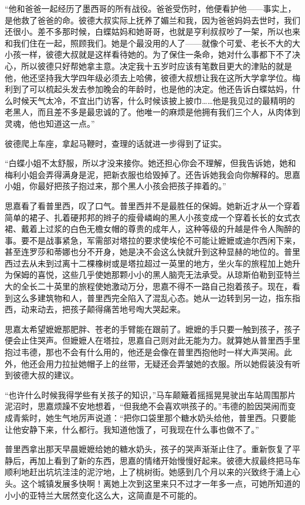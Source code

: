 \par “他和爸爸一起经历了墨西哥的所有战役。爸爸受伤时，他便看护他——事实上，是他救了爸爸的命。彼德大叔实际上抚养了媚兰和我，因为爸爸妈妈去世时，我们还很小。差不多那时候，白蝶姑妈和她哥哥，也就是亨利叔叔吵了一架，所以也来和我们住在一起，照顾我们。她是个最没用的人了——就像个可爱、老长不大的大小孩一样，彼德大叔就是这样看待她的。为了保住一条命，她对什么事都下不了决心，所以彼德只好帮她拿主意。决定我十五岁时应该有笔数目更大的津贴的就是他，他还坚持我大学四年级必须去上哈佛，彼德大叔想让我在这所大学拿学位。梅利到了可以梳起头发去参加晚会的年龄时，也是他的决定。他还告诉白蝶姑妈，什么时候天气太冷，不宜出门访客，什么时候该披上披巾……他是我见过的最精明的老黑人，而且差不多是最忠诚的了。他唯一的麻烦是他拥有我们三个人，从肉体到灵魂，他也知道这一点。”
\par 彼德爬上车座，拿起马鞭时，查理的话就进一步得到了证实。
\par “白蝶小姐不太舒服，所以才没来接你。她还担心你会不理解，但我告诉她，她和梅利小姐会弄得满身是泥，把新衣服也给毁掉了。还告诉她我会向你解释的。思嘉小姐，你最好把孩子抱过来，那个黑人小孩会把孩子摔着的。”
\par 思嘉看了看普里西，叹了口气。普里西并不是最胜任的保姆。她新近才从一个穿着简单的裙子、扎着硬邦邦的辫子的瘦骨嶙峋的黑人小孩变成一个穿着长长的女式衣裙、戴着上过浆的白色无檐女帽的尊贵的成年人，这种等级的升越是件令人陶醉的事。要不是战事紧急，军需部对塔拉的要求使埃伦不可能让嬷嬷或迪尔西闲下来，甚至连罗莎和蒂娜也分不开身，她是决不会这么快就升到这种显赫的地位的。普里西过去从未到过离十二棵橡树或是塔拉超过一英里的地方，坐火车的旅程加上她升为保姆的喜悦，这些几乎使她那颗小小的黑人脑壳无法承受。从琼斯伯勒到亚特兰大的全长二十英里的旅程使她激动万分，思嘉不得不一路自己抱着孩子。现在，看到这么多建筑物和人，普里西完全陷入了混乱心态。她从一边转到另一边，指东指西，动来动去，把孩子颠得痛苦地号啕大哭起来。
\par 思嘉太希望嬷嬷那肥胖、苍老的手臂能在跟前了。嬷嬷的手只要一触到孩子，孩子便会止住哭声。但嬷嬷人在塔拉，思嘉自己则对此无能为力。就算她从普里西手里抱过韦德，那也不会有什么用的，他还是会像在普里西抱他时一样大声哭闹。此外，他还会用力拉扯她帽子上的丝带，无疑还会弄皱她的衣服。所以她假装没有听到彼德大叔的建议。
\par “也许什么时候我得学些有关孩子的知识，”马车颠簸着摇摇晃晃驶出车站周围那片泥沼时，思嘉烦躁不安地想着，“但我绝不会喜欢哄孩子的。”韦德的脸因哭闹而变成青紫时，她生气地厉声说道：“把你口袋里那个糖水奶头给他，普里西。只要能让他安静下来，什么都行。我知道他饿了，可我现在什么事也做不了。”
\par 普里西拿出那天早晨嬷嬷给她的糖水奶头，孩子的哭声渐渐止住了。重新恢复了平静后，再加上看到了新的东西，思嘉的情绪开始慢慢好起来。彼德大叔最终把马车顺利地赶出坑坑洼洼的泥泞地，上了桃树街。她感到几个月以来的兴致终于涌上心头。这个城镇发展多快啊！离她上次到这里来只不过才一年多一点，可她所知道的小小的亚特兰大居然变化这么大，这简直是不可能的。

